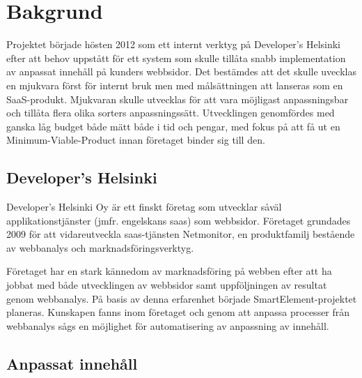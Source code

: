 \section{Bakgrund}

Projektet började hösten 2012 som ett internt verktyg på Developer's Helsinki efter att behov uppstått för ett system som skulle tillåta snabb implementation av anpassat innehåll på kunders webbsidor. Det bestämdes att det skulle uvecklas en mjukvara först för internt bruk men med målsättningen att lanseras som en SaaS-produkt. Mjukvaran skulle utvecklas för att vara möjligast anpassningsbar och tillåta flera olika sorters anpassningssätt. Utvecklingen genomfördes med ganska låg budget både mätt både i tid och pengar, med fokus på att få ut en Minimum-Viable-Product innan företaget binder sig till den.

\subsection{Developer's Helsinki}

Developer's Helsinki Oy är ett finskt företag som utvecklar såväl applikationstjänster (jmfr. engelskans \gls{saas}) som webbsidor. Företaget grundades 2009 för att vidareutveckla  \gls{saas}-tjänsten Netmonitor, en produktfamilj bestående av webbanalys och marknadsföringsverktyg.

Företaget har en stark kännedom av marknadsföring på webben efter att ha jobbat med både utvecklingen av webbsidor samt uppföljningen av resultat genom webbanalys. På basis av denna erfarenhet började SmartElement-projektet planeras. Kunskapen fanns inom företaget och genom att anpassa processer från webbanalys sågs en möjlighet för automatisering av anpassning av innehåll.

\subsection{Anpassat innehåll}

